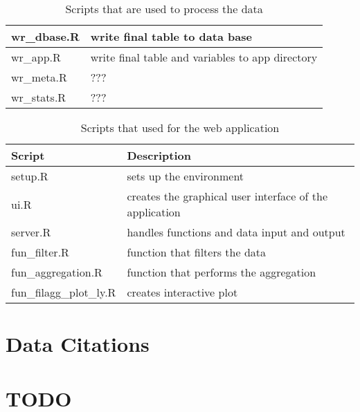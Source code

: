 \documentclass[english]{article}
\begin{document}
\begin{table}[h!]
\begin{tabular}{|l|l|}
wr\_dbase.R                 & write final table to data base                   \\ \hline
wr\_app.R                   & write final table and variables to app directory \\ \hline
wr\_meta.R                  & ???                                              \\ \hline
wr\_stats.R                 & ???                                              \\ \hline
\end{tabular}
\caption{Scripts that are used to process the data}
\label{tab:scripts-pipeline}
\end{table}

\begin{table}[h!]
\begin{tabular}{|l|l|}
\hline
Script                     & Description                                               \\ \hline
setup.R                    & sets up the environment                                   \\ \hline
ui.R                       & creates the graphical user interface of the application   \\ \hline
server.R                   & handles functions and data input and output               \\ \hline
fun\_filter.R              & function that filters the data                            \\ \hline
fun\_aggregation.R         & function that performs the aggregation                    \\ \hline
fun\_filagg\_plot\_ly.R    & creates interactive plot                                  \\ \hline
\end{tabular}
\caption{Scripts that used for the web application}
\label{tab:scripts-app}
\end{table}


\pagebreak




\section*{Data Citations}

\pagebreak
\section*{TODO}
\end{document}
